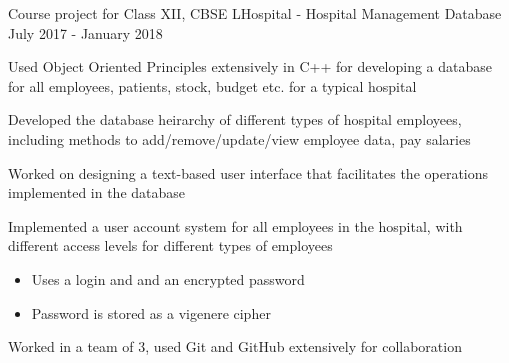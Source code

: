 \begin{cventries}
  \cventry
    {Course project for Class XII, CBSE}
    {LHospital - Hospital Management Database}
    {}
    {July 2017 - January 2018}
    {
      \begin{cvitems}
        \item {Used Object Oriented Principles extensively in C++ for developing a database for all employees, patients, stock, budget etc. for a typical hospital}
        \item {Developed the database heirarchy of different types of hospital employees, including methods to add/remove/update/view employee data, pay salaries }
        \item {Worked on designing a text-based user interface that facilitates the operations implemented in the database}
        \item {
          Implemented a user account system for all employees in the hospital, with different access levels for different types of employees
          \begin{itemize} 
            \item {Uses a login and and an encrypted password}
            \item {Password is stored as a vigenere cipher}
          \end{itemize}
        }
        \item {Worked in a team of 3, used Git and GitHub extensively for collaboration}
      \end{cvitems}
    }
\end{cventries}